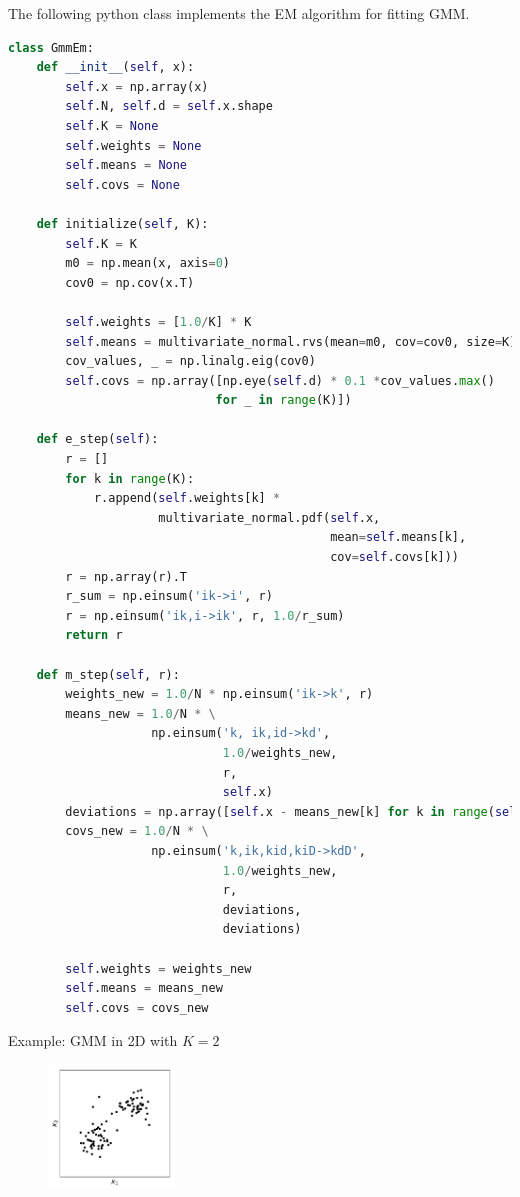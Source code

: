 \newpage
\no The following python class implements the EM algorithm for fitting GMM.
\begin{lstlisting}[language=python]
class GmmEm:
    def __init__(self, x):
        self.x = np.array(x)
        self.N, self.d = self.x.shape
        self.K = None
        self.weights = None
        self.means = None
        self.covs = None
    
    def initialize(self, K):
        self.K = K
        m0 = np.mean(x, axis=0)
        cov0 = np.cov(x.T)

        self.weights = [1.0/K] * K
        self.means = multivariate_normal.rvs(mean=m0, cov=cov0, size=K)
        cov_values, _ = np.linalg.eig(cov0)
        self.covs = np.array([np.eye(self.d) * 0.1 *cov_values.max()
                             for _ in range(K)])
        
    def e_step(self):
        r = []
        for k in range(K):
            r.append(self.weights[k] * 
                     multivariate_normal.pdf(self.x, 
                                             mean=self.means[k],
                                             cov=self.covs[k]))
        r = np.array(r).T
        r_sum = np.einsum('ik->i', r)
        r = np.einsum('ik,i->ik', r, 1.0/r_sum)
        return r
    
    def m_step(self, r):
        weights_new = 1.0/N * np.einsum('ik->k', r)
        means_new = 1.0/N * \
                    np.einsum('k, ik,id->kd', 
                              1.0/weights_new, 
                              r, 
                              self.x)
        deviations = np.array([self.x - means_new[k] for k in range(self.K)])
        covs_new = 1.0/N * \
                    np.einsum('k,ik,kid,kiD->kdD', 
                              1.0/weights_new, 
                              r, 
                              deviations, 
                              deviations)
        
        self.weights = weights_new
        self.means = means_new
        self.covs = covs_new
\end{lstlisting}

\newpage
\no Example: GMM in 2D with $K=2$
\begin{figure}[h]
\centering
	\includegraphics[width=0.30\textwidth]{./figs/05-gmm-data.pdf}
\end{figure}

